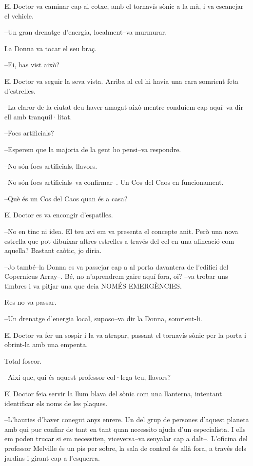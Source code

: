 El Doctor va caminar cap al cotxe, amb el tornavís sònic a la mà, i va
escanejar el vehicle.

--Un gran drenatge d'energia, localment--va murmurar.

La Donna va tocar el seu braç.

--Ei, has vist això?

El Doctor va seguir la seva vista. Arriba al cel hi havia una cara
somrient feta d'estrelles.

--La claror de la ciutat deu haver amagat això mentre conduíem cap
aquí--va dir ell amb tranquil·litat.

--Focs artificials?

--Esperem que la majoria de la gent ho pensi--va respondre.

--No són focs artificials, llavors.

--No són focs artificials--va confirmar--. Un Cos del Caos en
funcionament.

--Què és un Cos del Caos quan és a casa?

El Doctor es va encongir d'espatlles.

--No en tinc ni idea. El teu avi em va presenta el concepte anit. Però
una nova estrella que pot dibuixar altres estrelles a través del cel en
una alineació com aquella? Bastant caòtic, jo diria.

--Jo també--la Donna es va passejar cap a al porta davantera de
l'edifici del Copernicus Array--. Bé, no n'aprendrem gaire aquí fora,
oi? --va trobar uns timbres i va pitjar una que deia NOMÉS EMERGÈNCIES.

Res no va passar.

--Un drenatge d'energia local, suposo--va dir la Donna, somrient-li.

El Doctor va fer un sospir i la va atrapar, passant el tornavís sònic
per la porta i obrint-la amb una empenta.

Total foscor.

--Així que, qui és aquest professor col·lega teu, llavors?

El Doctor feia servir la llum blava del sònic com una llanterna,
intentant identificar els noms de les plaques.

--L'hauries d'haver conegut anys enrere. Un del grup de persones
d'aquest planeta amb qui puc confiar de tant en tant quan necessito
ajuda d'un especialista. I ells em poden trucar si em necessiten,
viceversa--va senyalar cap a dalt--. L'oficina del professor Melville és
un pis per sobre, la sala de control és allà fora, a través dels jardins
i girant cap a l'esquerra.

